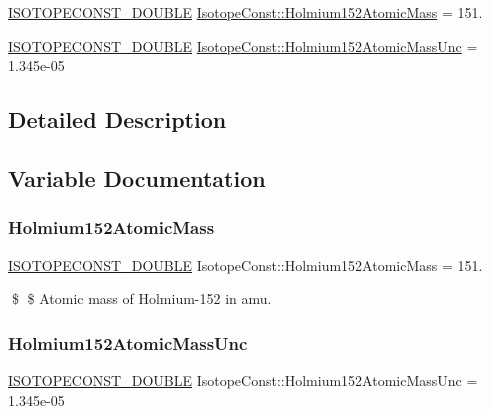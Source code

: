 \begin{DoxyCompactItemize}
\item 
\mbox{\hyperlink{group___isotope_const-_macros_ga8f45a7272ce02c0b4c65c44636ed719a}{I\+S\+O\+T\+O\+P\+E\+C\+O\+N\+S\+T\+\_\+\+D\+O\+U\+B\+LE}} \mbox{\hyperlink{group___isotope_const-_holmium-_ho152_ga721359ed3036828039c43c383d426fc5}{Isotope\+Const\+::\+Holmium152\+Atomic\+Mass}} = 151.
\item 
\mbox{\hyperlink{group___isotope_const-_macros_ga8f45a7272ce02c0b4c65c44636ed719a}{I\+S\+O\+T\+O\+P\+E\+C\+O\+N\+S\+T\+\_\+\+D\+O\+U\+B\+LE}} \mbox{\hyperlink{group___isotope_const-_holmium-_ho152_ga38788ca4400d61abfb9f7e8bad482af1}{Isotope\+Const\+::\+Holmium152\+Atomic\+Mass\+Unc}} = 1.\+345e-\/05
\end{DoxyCompactItemize}


\subsection{Detailed Description}


\subsection{Variable Documentation}
\mbox{\label{group___isotope_const-_holmium-_ho152_ga721359ed3036828039c43c383d426fc5}} 
\subsubsection{\texorpdfstring{Holmium152\+Atomic\+Mass}{Holmium152AtomicMass}}
{\footnotesize\ttfamily \mbox{\hyperlink{group___isotope_const-_macros_ga8f45a7272ce02c0b4c65c44636ed719a}{I\+S\+O\+T\+O\+P\+E\+C\+O\+N\+S\+T\+\_\+\+D\+O\+U\+B\+LE}} Isotope\+Const\+::\+Holmium152\+Atomic\+Mass = 151.}

\$ \$ Atomic mass of Holmium-\/152 in amu. \mbox{\label{group___isotope_const-_holmium-_ho152_ga38788ca4400d61abfb9f7e8bad482af1}} 
\subsubsection{\texorpdfstring{Holmium152\+Atomic\+Mass\+Unc}{Holmium152AtomicMassUnc}}
{\footnotesize\ttfamily \mbox{\hyperlink{group___isotope_const-_macros_ga8f45a7272ce02c0b4c65c44636ed719a}{I\+S\+O\+T\+O\+P\+E\+C\+O\+N\+S\+T\+\_\+\+D\+O\+U\+B\+LE}} Isotope\+Const\+::\+Holmium152\+Atomic\+Mass\+Unc = 1.\+345e-\/05}

